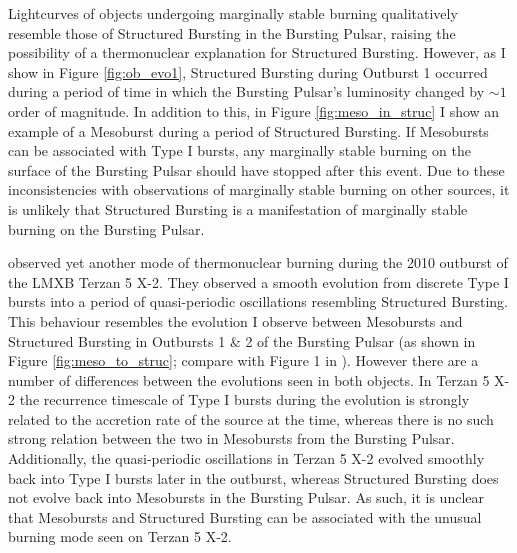 \par Lightcurves of objects undergoing marginally stable burning qualitatively resemble those of Structured Bursting in the Bursting Pulsar, raising the possibility of a thermonuclear explanation for Structured Bursting.  However, as I show in Figure \ref{fig:ob_evo1}, Structured Bursting during Outburst 1 occurred during a period of time in which the Bursting Pulsar's luminosity changed by $\sim1$ order of magnitude.  In addition to this, in Figure \ref{fig:meso_in_struc} I show an example of a Mesoburst during a period of Structured Bursting.  If Mesobursts can be associated with Type I bursts, any marginally stable burning on the surface of the Bursting Pulsar should have stopped after this event.  Due to these inconsistencies with observations of marginally stable burning on other sources, it is unlikely that Structured Bursting is a manifestation of marginally stable burning on the Bursting Pulsar.
\par \citet{Linares_MargStab} observed yet another mode of thermonuclear burning during the 2010 outburst of the LMXB Terzan 5 X-2.  They observed a smooth evolution from discrete Type I bursts into a period of quasi-periodic oscillations resembling Structured Bursting.  This behaviour resembles the evolution I observe between Mesobursts and Structured Bursting in Outbursts 1 \& 2 of the Bursting Pulsar (as shown in Figure \ref{fig:meso_to_struc}; compare with Figure 1 in \citealp{Linares_MargStab}).  However there are a number of differences between the evolutions seen in both objects.  In Terzan 5 X-2 the recurrence timescale of Type I bursts during the evolution is strongly related to the accretion rate of the source at the time, whereas there is no such strong relation between the two in Mesobursts from the Bursting Pulsar.  Additionally, the quasi-periodic oscillations in Terzan 5 X-2 evolved smoothly back into Type I bursts later in the outburst, whereas Structured Bursting does not evolve back into Mesobursts in the Bursting Pulsar.  As such, it is unclear that Mesobursts and Structured Bursting can be associated with the unusual burning mode seen on Terzan 5 X-2.

